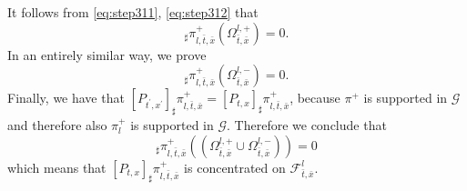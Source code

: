 \documentclass[11pt, twoside, reqno]{amsart}
\theoremstyle{definition}
\theoremstyle{remark}
\numberwithin{equation}{section}
\newcommand{\msc}[1]{\mathscr{#1}}
\begin{document}
It follows from \eqref{eq:step311}, \eqref{eq:step312} that 
\begin{equation}
     [P_{t,x}]_{\sharp}\pi^+_{l,\bar t, \bar x}(\Omega^{l,+}_{\bar t, \bar x}) = 0.
\end{equation}
In an entirely similar way, we prove
\begin{equation}
[P_{t^{\prime},x^{\prime}}]_{\sharp}\pi^+_{l,\bar t, \bar x}(\Omega^{l,-}_{\bar t, \bar x}) = 0.
\end{equation}
Finally, we have that $[P_{t^{\prime},x^{\prime}}]_{\sharp}\pi^+_{l,\bar t, \bar x} =  [P_{t,x}]_{\sharp}\pi^+_{l,\bar t, \bar x}$, because $\pi^+$ is supported in $\mathcal G$ and therefore also $\pi_l^+$ is supported in $\mathcal G$.
Therefore we conclude that 
\begin{equation}
    [P_{t,x}]_{\sharp} \pi^+_{l,\bar t, \bar x}( (\Omega^{l,+}_{\bar t, \bar x} \cup \Omega^{l,-}_{\bar t, \bar x})) = 0
\end{equation}
which means that $[P_{t,x}]_{\sharp} \pi^+_{l,\bar t, \bar x}$ is concentrated on $\msc F^l_{\bar t, \bar x}$.
\end{document}
